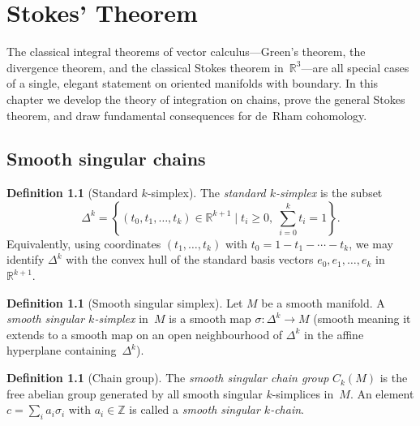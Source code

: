 \documentclass[12pt,a4paper,openany]{book}
\theoremstyle{definition}
\newtheorem{definition}[theorem]{Definition}
\theoremstyle{remark}
\newcommand{\Z}{\mathbb{Z}}
\newcommand{\R}{\mathbb{R}}
\newcommand{\set}[1]{\left\{ #1 \right\}}
\begin{document}

\chapter{Stokes' Theorem}\label{ch:stokes}
\minitoc\vspace{1em}

The classical integral theorems of vector calculus---Green's theorem,
the divergence theorem, and the classical Stokes theorem in~$\R^3$---are
all special cases of a single, elegant statement on oriented manifolds
with boundary.  In this chapter we develop the theory of integration on
chains, prove the general Stokes theorem, and draw fundamental
consequences for de~Rham cohomology.

\section{Smooth singular chains}\label{sec:chains}

\begin{definition}[Standard $k$-simplex]\label{def:standard-simplex}
The \emph{standard $k$-simplex} is the subset
\[
  \Delta^k = \set{(t_0,t_1,\dots,t_k)\in\R^{k+1} \;\big|\;
    t_i\ge 0,\; \sum_{i=0}^{k} t_i = 1}.
\]
Equivalently, using coordinates $(t_1,\dots,t_k)$ with $t_0 = 1 - t_1 - \cdots - t_k$, we may
identify $\Delta^k$ with the convex hull of the standard basis vectors
$e_0,e_1,\dots,e_k$ in~$\R^{k+1}$.
\end{definition}

\begin{definition}[Smooth singular simplex]\label{def:sing-simplex}
Let $M$ be a smooth manifold.  A \emph{smooth singular $k$-simplex} in~$M$
is a smooth map $\sigma\colon \Delta^k \to M$ (smooth meaning it
extends to a smooth map on an open neighbourhood of $\Delta^k$
in the affine hyperplane containing~$\Delta^k$).
\end{definition}

\begin{definition}[Chain group]\label{def:chain-group}
The \emph{smooth singular chain group} $C_k(M)$ is the free abelian
group generated by all smooth singular $k$-simplices in~$M$.  An
element $c = \sum_i a_i \sigma_i$ with $a_i\in\Z$ is called a
\emph{smooth singular $k$-chain}.
\end{definition}
\end{document}

